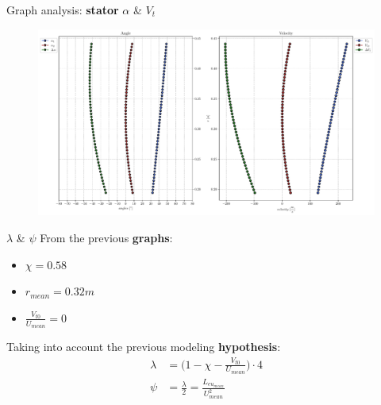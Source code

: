 {	\begin{frame}{Graph analysis: \textbf{stator} $\alpha$ \& $V_{t}$}
		\begin{figure}
			\centering
			\includegraphics[width=\textwidth]{figures/alphaAngles.pdf}
		\end{figure}
	\end{frame}
	}

	\begin{frame}{$\lambda$ \& $\psi$}
		From the previous \textbf{graphs}:
		\begin{itemize}
            \item \let\thefootnote\relax{}$\chi = 0.58$
				  \let\thefootnote\svthefootnote
			\item $r_{mean} = 0.32 m$
			\item $\frac{V_{t0}}{U_{mean}} = 0$
		\end{itemize}
		Taking into account the previous modeling \textbf{hypothesis}:
		\begin{align}
			\lambda & = \Bigg( 1 - \chi - \frac{V_{t0}}{U_{mean}} \Bigg) \cdot 4 \nonumber \\
			\psi    & = \frac{\lambda}{2} = \frac{L_{eu_{mean}}}{U_{mean}^2} \nonumber
		\end{align}
	\end{frame}
	
